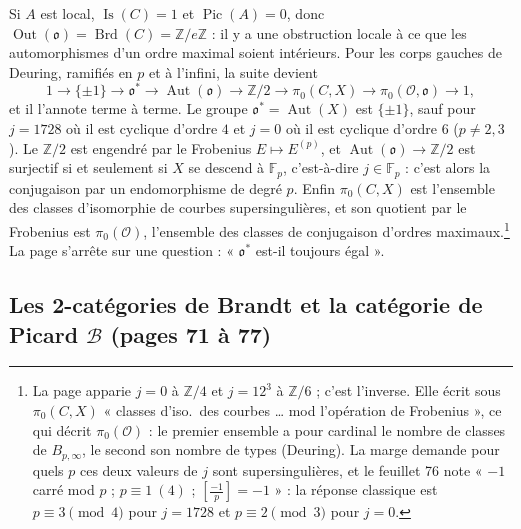 \documentclass[11pt,a4paper]{article}
\begin{document}
Si $A$ est local, $\operatorname{Is}(C) = 1$ et $\operatorname{Pic}(A) = 0$, donc
$\operatorname{Out}(\mathfrak{o}) = \operatorname{Brd}(C) =
\mathbb{Z}/e\mathbb{Z}$ : il y a une obstruction locale à ce que les
automorphismes d'un ordre maximal soient intérieurs. Pour les corps gauches de
Deuring, ramifiés en $p$ et à l'infini, la suite devient
\[
  1 \to \{\pm 1\} \to \mathfrak{o}^{*} \to \operatorname{Aut}(\mathfrak{o}) \to
  \mathbb{Z}/2 \to \pi_{0}(C, X) \to \pi_{0}(\mathcal{O}, \mathfrak{o}) \to 1 ,
\]
et il l'annote terme à terme. Le groupe $\mathfrak{o}^{*} =
\operatorname{Aut}(X)$ est $\{\pm 1\}$, sauf pour $j = 1728$ où il est cyclique
d'ordre $4$ et $j = 0$ où il est cyclique d'ordre $6$ ($p \neq 2, 3$). Le
$\mathbb{Z}/2$ est engendré par le Frobenius $E \mapsto E^{(p)}$, et
$\operatorname{Aut}(\mathfrak{o}) \to \mathbb{Z}/2$ est surjectif si et seulement
si $X$ se descend à $\mathbb{F}_{p}$, c'est-à-dire $j \in \mathbb{F}_{p}$ :
c'est alors la conjugaison par un endomorphisme de degré $p$. Enfin
$\pi_{0}(C, X)$ est l'ensemble des classes d'isomorphie de courbes
supersingulières, et son quotient par le Frobenius est $\pi_{0}(\mathcal{O})$,
l'ensemble des classes de conjugaison d'ordres maximaux.\footnote{La page
apparie $j = 0$ à $\mathbb{Z}/4$ et $j = 12^{3}$ à $\mathbb{Z}/6$ ; c'est
l'inverse. Elle écrit sous $\pi_{0}(C, X)$ « classes d'iso.\ des courbes …
mod l'opération de Frobenius », ce qui décrit $\pi_{0}(\mathcal{O})$ : le premier
ensemble a pour cardinal le nombre de classes de $B_{p,\infty}$, le second son
nombre de types (Deuring). La marge demande pour quels $p$ ces deux valeurs de
$j$ sont supersingulières, et le feuillet 76 note « $-1$ carré mod $p$ ;
$p \equiv 1\ (4)$ ; $\left[\frac{-1}{p}\right] = -1$ » : la réponse classique est
$p \equiv 3 \pmod 4$ pour $j = 1728$ et $p \equiv 2 \pmod 3$ pour $j = 0$.} La
page s'arrête sur une question : « $\mathfrak{o}^{*}$ est-il toujours égal ».

\subsection*{Les 2-catégories de Brandt et la catégorie de Picard $\mathcal{B}$ (pages 71 à 77)}
\end{document}
